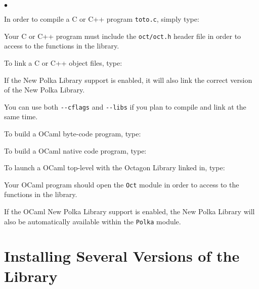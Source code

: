\documentclass[twosides]{report}
\newenvironment{mylist}
        {\vskip-3mm\begin{list}{$\bullet$}{\setlength{\leftmargin}{.5cm}}}
        {\end{list}}
\begin{document}
\begin{mylist}
\item In order to compile a C or C++ program {\tt toto.c}, simply type:
\par{}
\par\noindent Your C or C++ program must include the {\tt oct/oct.h} 
header file in order to access to the functions in the library.

\item To link a C or C++ object files, type:
\par{}
\par\noindent If the New Polka Library support is enabled, it will also link 
the correct version of the New Polka Library.

\item You can use both {\tt -{}-cflags} and {\tt -{}-libs} if you plan to
compile and link at the same time.

\item To build a OCaml byte-code program, type:
\par{}

\item To build a OCaml native code program, type:
\par{}

\item To launch a OCaml top-level with the Octagon Library linked in, type:
\par{}
\par\noindent Your OCaml program should open the {\tt Oct} module in
order to access to the functions in the library.
\par\noindent If the OCaml New Polka Library support is enabled, the New
Polka Library will also be automatically
available within the {\tt Polka} module.
\end{mylist}

\section{Installing Several Versions of the Library}
\end{document}
